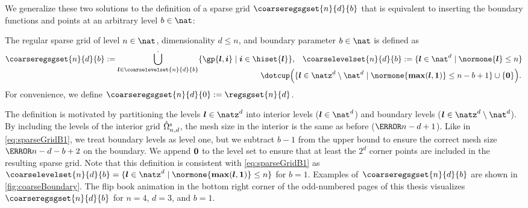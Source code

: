 We generalize these two solutions to the definition of a
sparse grid $\coarseregsgset{n}{d}{b}$ that is equivalent to inserting
the boundary functions and points at an arbitrary level $b \in \nat$:
\begin{definition}
  \label{def:coarseBoundary}
  The regular sparse grid of level $n \in \nat$,
  dimensionality $d \le n$, and boundary parameter $b \in \nat$ is defined as
  \begin{equation}
    \label{eq:coarseBoundary}
    \begin{split}
      \coarseregsgset{n}{d}{b}
      := \bigdotcup_{\*l \in \coarselevelset{n}{d}{b}}
      \{\gp{\*l,\*i} \mid \*i \in \hiset{\*l}\},&\quad
      \coarselevelset{n}{d}{b}
      := \{\*l \in \nat^d \mid \normone{\*l} \le n\}\\[-1em]
      &\hspace*{-15mm} {} \dotcup \paren*{
        \{\*l \in \natz^d \setminus \nat^d \mid
        \normone{\vecmax(\*l, \*1)} \le n-b+1\} \cup \{\*0\}
      }.
    \end{split}
  \end{equation}
  For convenience, we define
  $\coarseregsgset{n}{d}{0} := \regsgset{n}{d}$.
\end{definition}
The definition is motivated by partitioning the levels $\*l \in \natz^d$
into interior levels ($\*l \in \nat^d$)
and boundary levels ($\*l \in \natz^d \setminus \nat^d$).
By including the levels of the interior grid $\interiorregsgset{n}{d}$,
the mesh size in the interior is the same as before ($\ms{n-d+1}$).
Like in \eqref{eq:sparseGridB1}, we treat boundary levels as level one,
but we subtract $b - 1$ from the upper bound to ensure the correct
mesh size $\ms{n-d-b+2}$ on the boundary.
We append ${\boldsymbol{0}}$ to the level set to ensure that at least the $2^d$ corner
points are included in the resulting sparse grid.
Note that this definition is consistent with \eqref{eq:sparseGridB1} as
$\coarselevelset{n}{d}{b}
= \{\*l \in \natz^d \mid \normone{\vecmax(\*l, \*1)} \le n\}$
for $b = 1$.
Examples of~$\coarseregsgset{n}{d}{b}$ are shown
in \cref{fig:coarseBoundary}.
The flip book animation in the bottom right corner of the
odd-numbered pages of this thesis
visualizes $\coarseregsgset{n}{d}{b}$ for $n = 4$, $d = 3$, and $b = 1$.

